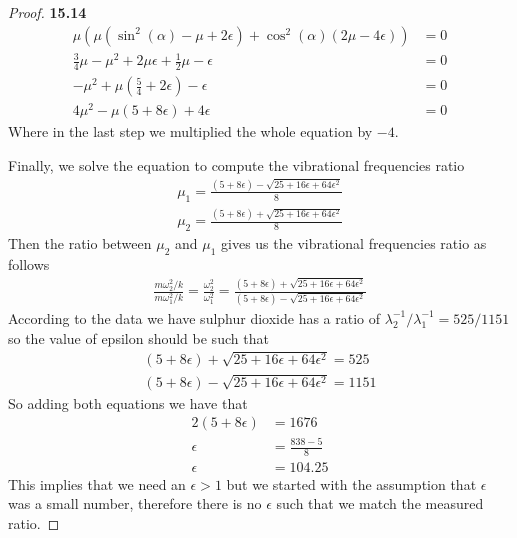 \documentclass[11pt]{article}
\theoremstyle{definition}
\begin{document}
\begin{proof}{\textbf{15.14}}
\begin{align*}
        \mu (\mu (\sin^2(\alpha) - \mu + 2\epsilon)
        + \cos^2(\alpha) (2\mu - 4\epsilon))&= 0\\
        \frac{3}{4}\mu - \mu^2 + 2\mu\epsilon
        + \frac{1}{2}\mu - \epsilon &= 0\\
        - \mu^2 + \mu(\frac{5}{4} + 2\epsilon) - \epsilon &= 0\\
        4\mu^2 - \mu(5 + 8\epsilon) + 4\epsilon &= 0
    \end{align*}
    Where in the last step we multiplied the whole equation by $-4$.

    Finally, we solve the equation to compute the vibrational frequencies
    ratio
    \begin{align*}
        \mu_1 = \frac{(5 + 8\epsilon) - \sqrt{25 + 16\epsilon + 64\epsilon^2}}
        {8}\\
        \mu_2 = \frac{(5 + 8\epsilon) + \sqrt{25 + 16\epsilon + 64\epsilon^2}}
        {8}
    \end{align*}
    Then the ratio between $\mu_2$ and $\mu_1$ gives us the vibrational
    frequencies ratio as follows
    \begin{align*}
        \frac{m\omega_2^2/k}{m\omega_1^2/k} = \frac{\omega_2^2}{\omega_1^2}
        = \frac{(5 + 8\epsilon) + \sqrt{25 + 16\epsilon + 64\epsilon^2}}
        {(5 + 8\epsilon) - \sqrt{25 + 16\epsilon + 64\epsilon^2}}
    \end{align*}
    According to the data we have sulphur dioxide has a ratio of
    $\lambda_2^{-1} /\lambda_1^{-1} = 525/1151$
    so the value of epsilon should be such that
    \begin{align*}
        (5 + 8\epsilon) + \sqrt{25 + 16\epsilon + 64\epsilon^2} = 525\\
        (5 + 8\epsilon) - \sqrt{25 + 16\epsilon + 64\epsilon^2} = 1151
    \end{align*}
    So adding both equations we have that
    \begin{align*}
        2(5 + 8\epsilon) &= 1676\\
        \epsilon &= \frac{838 -5}{8}\\
        \epsilon &= 104.25
    \end{align*}
    This implies that we need an $\epsilon > 1$ but we started with
    the assumption that $\epsilon$ was a small number, therefore there is no
    $\epsilon$ such that we match the measured ratio.
\end{proof}
\end{document}
